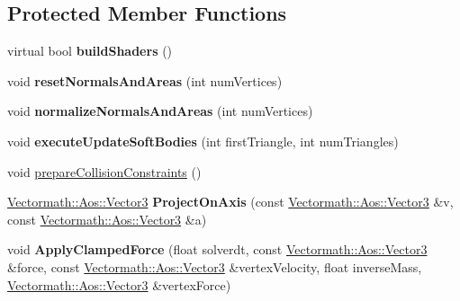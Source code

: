 \subsection*{Protected Member Functions}
\begin{DoxyCompactItemize}
\item 
\mbox{\label{classbtOpenCLSoftBodySolver_abf250e2e3a245d1a4ab25017b1c99292}} 
virtual bool {\bfseries build\+Shaders} ()
\item 
\mbox{\label{classbtOpenCLSoftBodySolver_a4de74e7bf2cd5f5a1dee373ded831844}} 
void {\bfseries reset\+Normals\+And\+Areas} (int num\+Vertices)
\item 
\mbox{\label{classbtOpenCLSoftBodySolver_aa96d60579ded5de8db6840ff09989b7d}} 
void {\bfseries normalize\+Normals\+And\+Areas} (int num\+Vertices)
\item 
\mbox{\label{classbtOpenCLSoftBodySolver_af4d900b86735ba975e04cf5111aa1e60}} 
void {\bfseries execute\+Update\+Soft\+Bodies} (int first\+Triangle, int num\+Triangles)
\item 
void \hyperlink{classbtOpenCLSoftBodySolver_a4c04cb2b16b762c4768304218c664470}{prepare\+Collision\+Constraints} ()
\item 
\mbox{\label{classbtOpenCLSoftBodySolver_a3a0f578011b93e94ac43a86387585a13}} 
\hyperlink{classVectormath_1_1Aos_1_1Vector3}{Vectormath\+::\+Aos\+::\+Vector3} {\bfseries Project\+On\+Axis} (const \hyperlink{classVectormath_1_1Aos_1_1Vector3}{Vectormath\+::\+Aos\+::\+Vector3} \&v, const \hyperlink{classVectormath_1_1Aos_1_1Vector3}{Vectormath\+::\+Aos\+::\+Vector3} \&a)
\item 
\mbox{\label{classbtOpenCLSoftBodySolver_acc300cbf275db4285f6337552f41a0b9}} 
void {\bfseries Apply\+Clamped\+Force} (float solverdt, const \hyperlink{classVectormath_1_1Aos_1_1Vector3}{Vectormath\+::\+Aos\+::\+Vector3} \&force, const \hyperlink{classVectormath_1_1Aos_1_1Vector3}{Vectormath\+::\+Aos\+::\+Vector3} \&vertex\+Velocity, float inverse\+Mass, \hyperlink{classVectormath_1_1Aos_1_1Vector3}{Vectormath\+::\+Aos\+::\+Vector3} \&vertex\+Force)
\item 

\end{DoxyCompactItemize}
